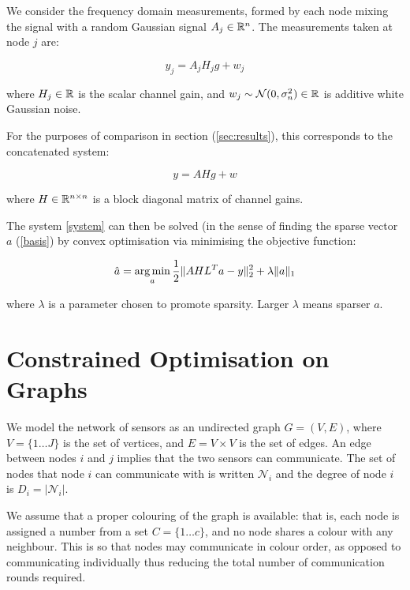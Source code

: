 \documentclass[conference]{IEEEtran}
\begin{document}
We consider the frequency domain measurements, formed by each node mixing the signal with a random Gaussian signal \(A_j \in {\mathbb{R}}^n\). The measurements taken at node \(j\) are:

\begin{equation}
y_j = A_jH_jg + w_j
\label{dist_system}
\end{equation}

where \(H_j \in {\mathbb{R}}\) is the scalar channel gain, and \(w_j \sim \mathcal{N}(0,\sigma^2_n) \in {\mathbb{R}} \) is additive white Gaussian noise. 

For the purposes of comparison in section (\ref{sec:results}), this corresponds to the concatenated system:

\begin{equation}
y = AHg + w
\label{system}
\end{equation}

where \(H \in {\mathbb{R}}^{n \times n}\) is a block diagonal matrix of channel gains.

The system  \ref{system} can then be solved (in the sense of finding the sparse vector \(a\) (\ref{basis}) by convex optimisation via minimising the objective function:

\begin{equation}
\hat{a} = \argmin_{a} \frac{1}{2}\|AHL^{T}a-y\|_2^2 + \lambda \|a\|_1
\label{opt}
\end{equation}

where \(\lambda\) is a parameter chosen to promote sparsity. Larger \(\lambda\) means sparser \(a\).

\section{Constrained Optimisation on Graphs}\label{sec:opt-on-graphs}

We model the network of sensors as an undirected graph \(G = \left(V,E\right)\), where \(V = \{1 \ldots J\}\) is the set of vertices, and \(E = V \times V\) is the set of edges. An edge between nodes \(i\) and \(j\) implies that the two sensors can communicate. The set of nodes that node \(i\) can communicate with is written \(\mathcal{N}_i\) and the degree of node \(i\) is \(D_i = |\mathcal{N}_i|\). 

We assume that a proper colouring of the graph is available: that is, each node is assigned a number from a set \(C = \{1 \ldots c \} \), and no node shares a colour with any neighbour. This is so that nodes may communicate in colour order, as opposed to communicating individually thus reducing the total number of communication rounds required. 
\end{document}
